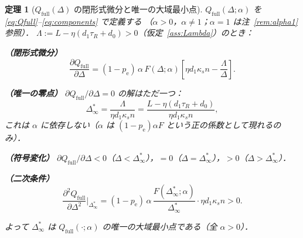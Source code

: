 \documentclass[12pt,a4paper]{article}
\theoremstyle{plain}
\newtheorem{theorem}{定理}[section]
\theoremstyle{definition}
\theoremstyle{remark}
\newcommand{\pe}{p_{\mathrm{e}}}
\newcommand{\Qf}{Q_{\mathrm{full}}}
\newcommand{\Dinf}{\Delta^{*}_{\infty}}
\begin{document}
\begin{theorem}[$\Qf(\Delta)$ の閉形式微分と唯一の大域最小点]\label{thm:main_exact}
$\Qf(\Delta;\alpha)$ を \eqref{eq:Qfull}--\eqref{eq:components} で定義する
（$\alpha>0$，$\alpha\ne1$；$\alpha=1$ は注~\ref{rem:alpha1} 参照）．
$\Lambda:=L-\eta(d_1\tau_R+d_0)>0$（仮定~\ref{ass:Lambda}）のとき：

\noindent\textbf{（閉形式微分）}
\begin{equation}\label{eq:dQfull}
\frac{\partial\Qf}{\partial\Delta}
=(1-\pe)\,\alpha\,F(\Delta;\alpha)\left[\eta d_1\kappa_s n-\frac{\Lambda}{\Delta}\right].
\end{equation}

\noindent\textbf{（唯一の零点）}
$\partial\Qf/\partial\Delta=0$ の解はただ一つ：
\begin{equation}\label{eq:Dinf_full}
\Dinf=\frac{\Lambda}{\eta d_1\kappa_s n}
=\frac{L-\eta(d_1\tau_R+d_0)}{\eta d_1\kappa_s n},
\end{equation}
これは $\alpha$ に依存しない（$\alpha$ は $(1-\pe)\alpha F$ という正の係数として現れるのみ）．

\noindent\textbf{（符号変化）}
$\partial\Qf/\partial\Delta<0$（$\Delta<\Dinf$），$=0$（$\Delta=\Dinf$），$>0$（$\Delta>\Dinf$）．

\noindent\textbf{（二次条件）}
\begin{equation}\label{eq:d2Qfull}
\frac{\partial^2\Qf}{\partial\Delta^2}\bigg|_{\Dinf}
=(1-\pe)\,\alpha\,\frac{F(\Dinf;\alpha)}{\Dinf}\cdot\eta d_1\kappa_s n>0.
\end{equation}

よって $\Dinf$ は $\Qf(\cdot;\alpha)$ の唯一の大域最小点である（全 $\alpha>0$）．
\end{theorem}
\end{document}
